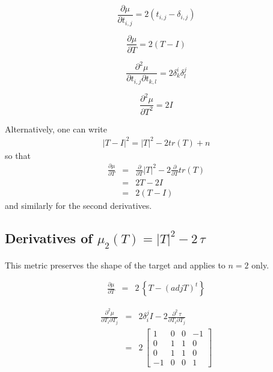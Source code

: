 \documentclass{report}
\begin{document}
\begin{equation}
\frac{\partial \mu}{\partial t_{i,j}} = 2 (t_{i,j} - \delta_{i,j})
\end{equation}

\begin{equation}
\frac{\partial \mu}{\partial T} = 2(T - I)
\end{equation}


\begin{equation}
\frac{\partial^2 \mu}{\partial t_{i,j} \partial t_{k,l}} = 2 \delta^i_k \delta^j_l \end{equation}

\begin{equation}
\frac{\partial^2 \mu}{\partial T^2} = 2 I
\end{equation}

\noindent Alternatively, one can write
\begin{eqnarray}
|T-I|^2 = |T|^2 - 2 tr(T) + n
\end{eqnarray}
so that 
\begin{eqnarray}
\frac{\partial \mu}{\partial T} & = & \frac{\partial}{\partial T} |T|^2 - 2 \frac{\partial}{\partial T} tr(T) \nonumber \\
 & = & 2 T - 2 I \nonumber \\
 & = & 2 (T-I)
\end{eqnarray}
and similarly for the second derivatives. \newline

\subsection{Derivatives of $\mu_2(T)=|T|^2 - 2 \, \tau$ \label{2ds}}

This metric preserves the shape of the target and applies to $n=2$ only. \newline

\begin{eqnarray}
\frac{\partial \mu}{\partial T} & = & 2 \, \left\{ T- (adj T)^t \right\}
\end{eqnarray}

\begin{eqnarray}
\frac{\partial^2 \mu}{\partial T_i \partial T_j} & = & 2 \delta_i^j I - 2 \frac{\partial^2 \, \tau}{\partial T_i \partial T_j} \nonumber \\
 & = & 2 \, \left[ \begin{array}{cccc}
1 & 0 & 0 & -1 \\
0 & 1 & 1 & 0 \\
0 & 1 & 1 & 0 \\
-1 & 0 & 0 & 1 
\end{array} \right]
\end{eqnarray}
\end{document}
